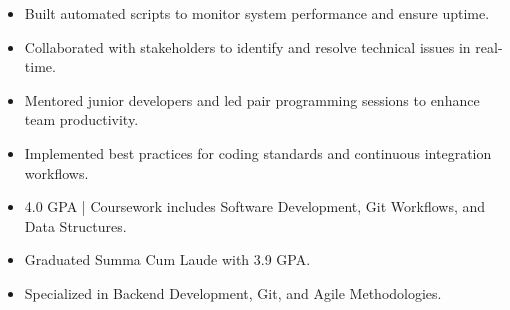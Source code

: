 \par\smallskip
\noindent
\begin{minipage}{20cm}
  \begin{minipage}{9.75cm}
    \begin{itemize}
      \item Built automated scripts to monitor system performance and ensure uptime.
      \item Collaborated with stakeholders to identify and resolve technical issues in real-time.
    \end{itemize}
  \end{minipage}
  \hfill
  \begin{minipage}{9.75cm}
    \begin{itemize}
      \item Mentored junior developers and led pair programming sessions to enhance team productivity.
      \item Implemented best practices for coding standards and continuous integration workflows.
    \end{itemize}
  \end{minipage}
\end{minipage}
\par\smallskip
\divider

\begin{itemize}
  \item 4.0 GPA | Coursework includes Software Development, Git Workflows, and Data Structures.
\end{itemize}
\divider

\begin{itemize}
  \item Graduated Summa Cum Laude with 3.9 GPA.
  \item Specialized in Backend Development, Git, and Agile Methodologies.
\end{itemize}

\noindent
\begin{minipage}{20cm}
\end{minipage}


